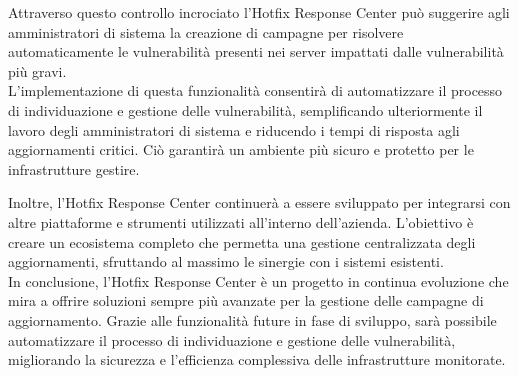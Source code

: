 Attraverso questo controllo incrociato l’Hotfix Response Center può suggerire agli 
amministratori di sistema la creazione di campagne per risolvere automaticamente le 
vulnerabilità presenti nei server impattati dalle vulnerabilità più gravi.\\

L'implementazione di questa funzionalità consentirà di automatizzare il processo di 
individuazione e gestione delle vulnerabilità, semplificando ulteriormente il lavoro degli 
amministratori di sistema e riducendo i tempi di risposta agli aggiornamenti critici. Ciò 
garantirà un ambiente più sicuro e protetto per le infrastrutture gestire.

Inoltre, l'Hotfix Response Center continuerà a essere sviluppato per integrarsi con altre 
piattaforme e strumenti utilizzati all'interno dell'azienda. L'obiettivo è creare un ecosistema 
completo che permetta una gestione centralizzata degli aggiornamenti, sfruttando 
al massimo le sinergie con i sistemi esistenti.\\

In conclusione, l'Hotfix Response Center è un progetto in continua evoluzione che mira a offrire 
soluzioni sempre più avanzate per la gestione delle campagne di aggiornamento. Grazie alle 
funzionalità future in fase di sviluppo, sarà possibile automatizzare il processo di 
individuazione e gestione delle vulnerabilità, migliorando la sicurezza e l'efficienza 
complessiva delle infrastrutture monitorate.
